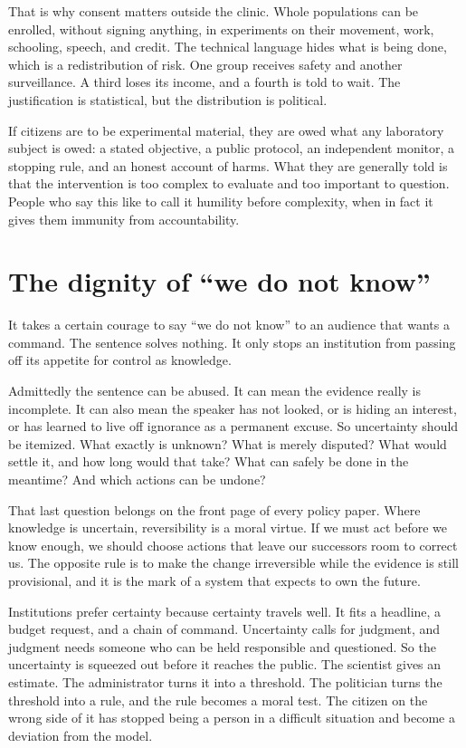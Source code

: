 \documentclass[12pt,a4paper]{book}
\begin{document}
That is why consent matters outside the clinic. Whole populations can be enrolled, without signing anything, in experiments on their movement, work, schooling, speech, and credit. The technical language hides what is being done, which is a redistribution of risk. One group receives safety and another surveillance. A third loses its income, and a fourth is told to wait. The justification is statistical, but the distribution is political.

If citizens are to be experimental material, they are owed what any laboratory subject is owed: a stated objective, a public protocol, an independent monitor, a stopping rule, and an honest account of harms. What they are generally told is that the intervention is too complex to evaluate and too important to question. People who say this like to call it humility before complexity, when in fact it gives them immunity from accountability.

\section{The dignity of ``we do not know''}

It takes a certain courage to say ``we do not know'' to an audience that wants a command. The sentence solves nothing. It only stops an institution from passing off its appetite for control as knowledge.

Admittedly the sentence can be abused. It can mean the evidence really is incomplete. It can also mean the speaker has not looked, or is hiding an interest, or has learned to live off ignorance as a permanent excuse. So uncertainty should be itemized. What exactly is unknown? What is merely disputed? What would settle it, and how long would that take? What can safely be done in the meantime? And which actions can be undone?

That last question belongs on the front page of every policy paper. Where knowledge is uncertain, reversibility is a moral virtue. If we must act before we know enough, we should choose actions that leave our successors room to correct us. The opposite rule is to make the change irreversible while the evidence is still provisional, and it is the mark of a system that expects to own the future.

Institutions prefer certainty because certainty travels well. It fits a headline, a budget request, and a chain of command. Uncertainty calls for judgment, and judgment needs someone who can be held responsible and questioned. So the uncertainty is squeezed out before it reaches the public. The scientist gives an estimate. The administrator turns it into a threshold. The politician turns the threshold into a rule, and the rule becomes a moral test. The citizen on the wrong side of it has stopped being a person in a difficult situation and become a deviation from the model.
\end{document}
